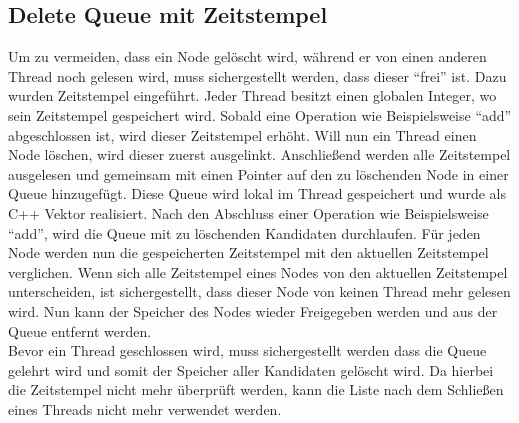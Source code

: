 \subsection{Delete Queue mit Zeitstempel}
Um zu vermeiden, dass ein Node gelöscht wird, während er von einen anderen Thread noch gelesen wird, muss sichergestellt werden, dass dieser ``frei'' ist. 
Dazu wurden Zeitstempel eingeführt. Jeder Thread besitzt einen globalen Integer, wo sein Zeitstempel gespeichert wird. Sobald eine Operation
wie Beispielsweise ``add'' abgeschlossen ist, wird dieser Zeitstempel erhöht.  Will nun ein Thread einen Node löschen, wird dieser zuerst ausgelinkt. 
Anschließend werden alle Zeitstempel ausgelesen und gemeinsam mit einen Pointer auf den zu löschenden Node in einer Queue hinzugefügt. Diese 
Queue wird lokal im Thread gespeichert und wurde als C++ Vektor realisiert. Nach den Abschluss einer Operation wie Beispielsweise ``add'', wird 
die Queue mit zu löschenden Kandidaten durchlaufen. Für jeden Node werden nun die gespeicherten Zeitstempel mit den aktuellen Zeitstempel verglichen. 
Wenn sich alle Zeitstempel eines Nodes von den aktuellen Zeitstempel unterscheiden, ist sichergestellt, dass dieser Node von keinen Thread mehr gelesen wird. 
Nun kann der Speicher des Nodes wieder Freigegeben werden und aus der Queue entfernt werden. 
\\Bevor ein Thread geschlossen wird, muss sichergestellt werden
dass die Queue gelehrt wird und somit der Speicher aller Kandidaten gelöscht wird. Da hierbei die Zeitstempel nicht mehr überprüft werden,
kann die Liste nach dem Schließen eines Threads nicht mehr verwendet werden. 